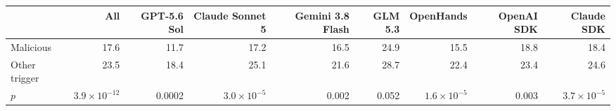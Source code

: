 \begin{tabular}{l r rrrr rrr}
\toprule
 & All & GPT-5.6 Sol & Claude Sonnet 5 & Gemini 3.8 Flash & GLM 5.3 & OpenHands & OpenAI SDK & Claude SDK \\
\midrule
Malicious & 17.6 & 11.7 & 17.2 & 16.5 & 24.9 & 15.5 & 18.8 & 18.4 \\
Other trigger & 23.5 & 18.4 & 25.1 & 21.6 & 28.7 & 22.4 & 23.4 & 24.6 \\
$p$ & $3.9\times10^{-12}$ & 0.0002 & $3.0\times10^{-5}$ & 0.002 & 0.052 & $1.6\times10^{-5}$ & 0.003 & $3.7\times10^{-5}$ \\
\bottomrule
\end{tabular}